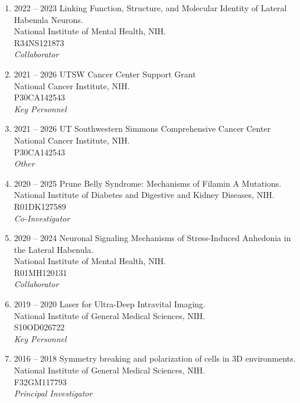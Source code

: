 \begin{enumerate}
\item 2022 -- 2023 
\hspace{8pt}
Linking Function, Structure, and Molecular Identity of Lateral Habenula Neurons. \\
National Institute of Mental Health, NIH. \\
R34NS121873 \\
{\it Collaborator}

\item 2021 -- 2026 
\hspace{8pt}
UTSW Cancer Center Support Grant \\
National Cancer Institute, NIH. \\
P30CA142543 \\ 
{\it Key Personnel}

\item 2021 -- 2026 
\hspace{8pt}
UT Southwestern Simmons Comprehensive Cancer Center \\
National Cancer Institute, NIH. \\
P30CA142543 \\ 
{\it Other}

\item 2020 -- 2025 
\hspace{8pt} 
Prune Belly Syndrome: Mechanisms of Filamin A Mutations. \\
National Institute of Diabetes and Digestive and Kidney Diseases, NIH. \\
R01DK127589 \\
{\it Co-Investigator} 

\item 2020 -- 2024
\hspace{8pt} 
Neuronal Signaling Mechanisms of Stress-Induced Anhedonia in the Lateral Habenula. \\
National Institute of Mental Health, NIH. \\
R01MH120131 \\ 
{\it Collaborator}

\item 2019 -- 2020 
\hspace{8pt} 
Laser for Ultra-Deep Intravital Imaging.\\
National Institute of General Medical Sciences, NIH. \\
S10OD026722 \\
{\it Key Personnel}

\item 2016 -- 2018 
\hspace{8pt} 
Symmetry breaking and polarization of cells in 3D environments.\\
National Institute of General Medical Sciences, NIH.\\
F32GM117793 \\
{\it Principal Investigator} 


\end{enumerate}
